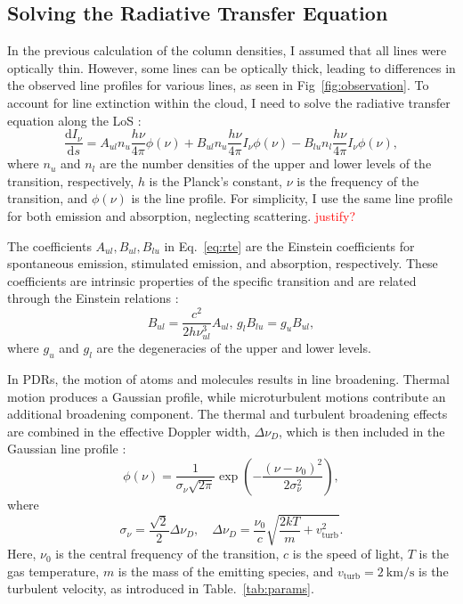\documentclass[12pt,a4paper]{article}
\newcommand{\mr}{\mathrm}
\newcommand{\fird}[2][]{\frac{\mathrm{d}#1}{\mathrm{d}#2}}
\newcommand{\qt}[1]{\textcolor{red}{#1}}
\begin{document}
\subsection{Solving the Radiative Transfer Equation} \label{sec:rte}
In the previous calculation of the column densities, I assumed that all lines were optically thin. However, some lines can be optically thick, leading to differences in the observed line profiles for various lines, as seen in Fig~\ref{fig:observation}. To account for line extinction within the cloud, I need to solve the radiative transfer equation along the LoS \parencite[see, e.g.,][ Eq.~1.67]{Rybicki1979}:
\begin{equation}
    \fird[I_\nu]{s} = A_{ul} n_u\frac{h\nu}{4\pi}\phi(\nu) +  B_{ul} n_u\frac{h\nu}{4\pi}I_\nu \phi(\nu) -  B_{lu} n_l\frac{h\nu}{4\pi}I_\nu \phi(\nu), \label{eq:rte}
\end{equation}  
where $n_u$ and $n_l$ are the number densities of the upper and lower levels of the transition, respectively, $h$ is the Planck's constant, $\nu$ is the frequency of the transition, and $\phi(\nu)$ is the line profile. For simplicity, I use the same line profile for both emission and absorption, neglecting scattering. \qt{justify?}

The coefficients $A_{ul}, B_{ul}, B_{lu}$ in Eq.~\ref{eq:rte} are the Einstein coefficients for spontaneous emission, stimulated emission, and absorption, respectively. These coefficients are intrinsic properties of the specific transition and are related through the Einstein relations \parencite{Einstein1917}:
\begin{equation}
    B_{ul} = \frac{c^2}{2 h \nu_{ul}^3} A_{ul},\, g_l B_{lu} = g_u B_{ul},
\end{equation}
where $g_u$ and $g_l$ are the degeneracies of the upper and lower levels.

In PDRs, the motion of atoms and molecules results in line broadening. Thermal motion produces a Gaussian profile, while microturbulent motions contribute an additional broadening component. The thermal and turbulent broadening effects are combined in the effective Doppler width, $\Delta \nu_D$, which is then included in the Gaussian line profile \parencite[see, e.g.,][Eqs.~10.68-10.72]{Rybicki1979}:
\begin{equation}
    \phi(\nu) = \frac{1}{\sigma_\nu \sqrt{2 \pi}}\exp\left(-\frac{(\nu - \nu_0)^2}{2 \sigma_\nu^2}\right),
\end{equation}
where
\begin{equation}
    \sigma_\nu = \frac{\sqrt{2}}{2}\Delta \nu_D, \quad \Delta \nu_D = \frac{\nu_0}{c}\sqrt{\frac{2 k T}{m} + v_\mr{turb}^2}.
\end{equation}
Here, $\nu_0$ is the central frequency of the transition, $c$ is the speed of light, $T$ is the gas temperature, $m$ is the mass of the emitting species, and $v_\mr{turb} = \qty{2}{\km\per\second}$ is the turbulent velocity, as introduced in Table.~\ref{tab:params}.
\end{document}
